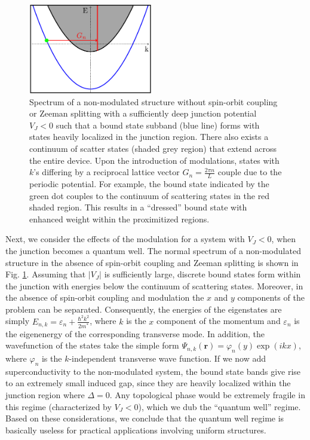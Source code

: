 \documentclass[twocolumn,aps,prb,nofootinbib]{revtex4-2}
\begin{document}

\begin{figure}[t]
\begin{center}
\includegraphics[width=0.48\textwidth]{FigXX.pdf}
\end{center}
\vspace{-0.6cm}
\caption{Spectrum of a non-modulated structure without spin-orbit coupling or Zeeman splitting with a sufficiently deep junction potential $V_J<0$ such that a bound state subband (blue line) forms with states heavily localized in the junction region. There also exists a continuum of scatter states (shaded grey region) that extend across the entire device. Upon the introduction of modulations, states with $k$'s differing by a reciprocal lattice vector $G_n = \frac{2\pi n}{L}$ couple due to the periodic potential. For example, the bound state indicated by the green dot couples to the continuum of scattering states in the red shaded region. This results in a ``dressed'' bound state with enhanced weight within the proximitized regions.}
\label{FIGXX}
\vspace{-1mm}
\end{figure}

Next, we consider the effects of the modulation for a system with $V_J < 0$, when the junction becomes a { quantum well}. The normal spectrum of a non-modulated structure in the absence of spin-orbit coupling and Zeeman splitting is shown in Fig. \ref{FIGXX}. 
Assuming that $|V_J|$ is sufficiently large, discrete bound states form within the junction with energies below the continuum of scattering states. Moreover, in the absence of spin-orbit coupling and modulation the $x$ and $y$ components of the problem can be separated. Consequently, the energies of the eigenstates are simply $E_{n,k} = \varepsilon_n + \frac{\hbar^2 k^2}{2 m^*}$, where $k$ is the $x$ component of the momentum and $\varepsilon_n$ is the eigenenergy of the corresponding transverse mode. In addition, the wavefunction of the states take the simple form $\Psi_{n,k}(\mathbf{r}) = \varphi_n(y) \exp(i k x)$, where $\varphi_n$ is the $k$-independent transverse wave function. If we now add superconductivity to the non-modulated system, the bound state bands give rise to an extremely small induced gap, since they are heavily localized within the junction region where $\Delta = 0$. Any topological phase would be extremely fragile in this regime (characterized by $V_J <0$), which we dub the ``quantum well'' regime. Based on these considerations, we conclude that the quantum well regime is basically useless for practical applications involving uniform structures. 
\end{document}

